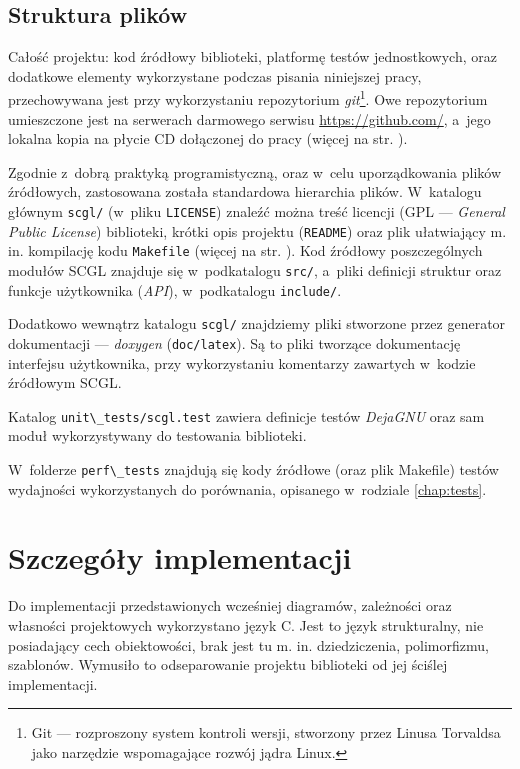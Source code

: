 \documentclass[a4paper,12pt,polish,twoside,openright]{thesis}
\newcommand\code[1]{\lstinline[style=line]{#1}}
\begin{document}
\subsection{Struktura plików}
Całość projektu: kod źródłowy biblioteki, platformę testów jednostkowych, oraz dodatkowe elementy wykorzystane podczas pisania niniejszej pracy, przechowywana jest przy wykorzystaniu repozytorium \emph{git}\footnote{Git --- rozproszony system kontroli wersji, stworzony przez Linusa Torvaldsa jako narzędzie wspomagające rozwój jądra Linux.}.
Owe repozytorium umieszczone jest na serwerach darmowego serwisu \url{https://github.com/}, a~jego lokalna kopia na płycie CD dołączonej do pracy (więcej na str. \pageref{chap:cd}).

Zgodnie z~dobrą praktyką programistyczną, oraz w~celu uporządkowania plików źródłowych, zastosowana została standardowa hierarchia plików.
W~katalogu głównym \code{scgl/} (w~pliku \code{LICENSE}) znaleźć można treść licencji (GPL --- \emph{General Public License}) biblioteki, krótki opis projektu (\code{README}) oraz plik ułatwiający m. in. kompilację kodu \code{Makefile} (więcej na str. \pageref{chap:make}).
Kod źródłowy poszczególnych modułów SCGL znajduje się w~podkatalogu \code{src/}, a~pliki definicji struktur oraz funkcje użytkownika (\emph{API}), w~podkatalogu \code{include/}.

Dodatkowo wewnątrz katalogu \code{scgl/} znajdziemy pliki stworzone przez generator dokumentacji ---  \emph{doxygen} (\code{doc/latex}).
Są to pliki tworzące dokumentację interfejsu użytkownika, przy wykorzystaniu komentarzy zawartych w~kodzie źródłowym SCGL.

Katalog \code{unit\_tests/scgl.test} zawiera definicje testów \emph{DejaGNU} oraz sam moduł wykorzystywany do testowania biblioteki.

W~folderze \code{perf\_tests} znajdują się kody źródłowe (oraz plik Makefile) testów wydajności wykorzystanych do porównania, opisanego w~rodziale \ref{chap:tests}.


\section{Szczegóły implementacji}
Do implementacji przedstawionych wcześniej diagramów, zależności oraz własności projektowych wykorzystano język C.
Jest to język strukturalny, nie posiadający cech obiektowości, brak jest tu m. in. dziedziczenia, polimorfizmu, szablonów.
Wymusiło to odseparowanie projektu biblioteki od jej ściślej implementacji.
\end{document}
